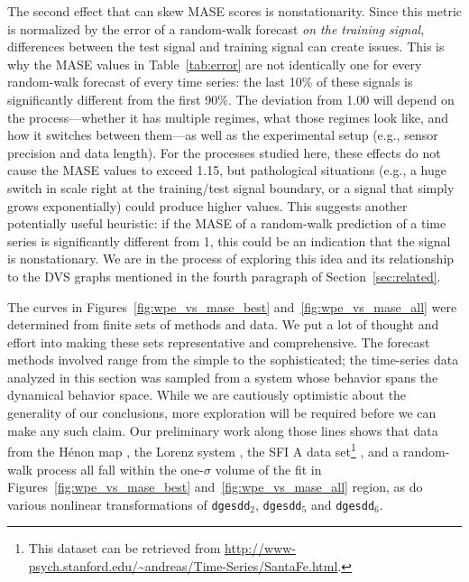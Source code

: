 \documentclass[%
pre,
reprint,
superscriptaddress,
showpacs,
nofootinbib,
nobibnotes,
 amsmath,amssymb,
 aps,
]{revtex4-1}
\newcommand{\svdone}{{\tt dgesdd}$_1$\xspace}
\newcommand{\svdtwo}{{\tt dgesdd$_2$}\xspace}
\newcommand{\svdfive}{{\tt dgesdd$_5$}\xspace}
\newcommand{\svdsix}{{\tt dgesdd$_6$}\xspace}
\begin{document}

The second effect that can skew MASE scores is nonstationarity.  Since
this metric is normalized by the error of a random-walk forecast
\emph{on the training signal}, differences between the test signal and
training signal can create issues.  This is why the MASE values in
Table~\ref{tab:error} are not identically one for every random-walk
forecast of every time series: the last 10\% of these signals is
significantly different from the first 90\%.  The deviation from 1.00
will depend on the process---whether it has multiple regimes, what
those regimes look like, and how it switches between them---as well as
the experimental setup (e.g., sensor precision and data length).  For
the processes studied here, these effects do not cause the MASE values
to exceed 1.15, but pathological situations (e.g., a huge switch in
scale right at the training/test signal boundary, or a signal that
simply grows exponentially) could produce higher values.  This
suggests another potentially useful heuristic: if the MASE of a
random-walk prediction of a time series is significantly different
from 1, this could be an indication that the signal is nonstationary.
We are in the process of exploring this idea and its relationship to
the DVS graphs mentioned in the fourth paragraph of
Section~\ref{sec:related}.

The curves in Figures~\ref{fig:wpe_vs_mase_best}
and~\ref{fig:wpe_vs_mase_all} were determined from finite sets of
methods and data.  We put a lot of thought and effort into making
these sets representative and comprehensive.  The forecast methods
involved range from the simple to the sophisticated; the time-series
data analyzed in this section was sampled from a system whose behavior
spans the dynamical behavior space.  While we are cautiously
optimistic about the generality of our conclusions, more exploration
will be required before we can make any such claim.  Our preliminary
work along those lines shows that data from the H\'enon map
\cite{henon}, the Lorenz system \cite{lorenz}, the SFI A data
set\footnote{This dataset can be retrieved from
  \url{http://www-psych.stanford.edu/~andreas/Time-Series/SantaFe.html}.}
\cite{weigend-book}, and a random-walk process all fall within the
one-$\sigma$ volume of the fit in Figures~\ref{fig:wpe_vs_mase_best}
and~\ref{fig:wpe_vs_mase_all} region, as do various nonlinear
transformations of \svdtwo, \svdfive and \svdsix.
\end{document}
